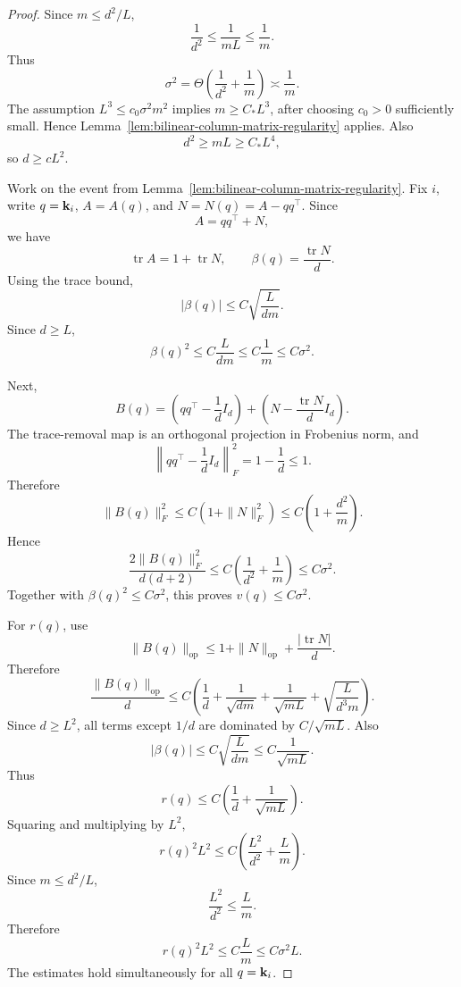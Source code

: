 \begin{proof}
Since \(m\le d^2/L\),
\[
\frac1{d^2}\le \frac1{mL}\le \frac1m.
\]
Thus
\[
\sigma^2=\Theta\left(\frac1{d^2}+\frac1m\right)\asymp \frac1m.
\]
The assumption \(L^3\le c_0\sigma^2m^2\) implies \(m\ge C_*L^3\), after choosing
\(c_0>0\) sufficiently small. Hence
Lemma~\ref{lem:bilinear-column-matrix-regularity} applies. Also
\[
d^2\ge mL\ge C_*L^4,
\]
so \(d\ge cL^2\).

Work on the event from Lemma~\ref{lem:bilinear-column-matrix-regularity}. Fix
\(i\), write \(q={\mathbf{k}}_i\), \(A=A(q)\), and \(N=N(q)=A-qq^\top\). Since
\[
A=qq^\top+N,
\]
we have
\[
\operatorname{tr}A=1+\operatorname{tr}N,
\qquad
\beta(q)=\frac{\operatorname{tr}N}{d}.
\]
Using the trace bound,
\[
|\beta(q)|\le C\sqrt{\frac{L}{dm}}.
\]
Since \(d\ge L\),
\[
\beta(q)^2\le C\frac{L}{dm}\le C\frac1m\le C\sigma^2.
\]

Next,
\[
B(q)
=
\left(qq^\top-\frac1dI_d\right)
+
\left(N-\frac{\operatorname{tr}N}{d}I_d\right).
\]
The trace-removal map is an orthogonal projection in Frobenius norm, and
\[
\left\|qq^\top-\frac1dI_d\right\|_F^2
=
1-\frac1d
\le1.
\]
Therefore
\[
\|B(q)\|_F^2
\le
C\left(1+\|N\|_F^2\right)
\le
C\left(1+\frac{d^2}{m}\right).
\]
Hence
\[
\frac{2\|B(q)\|_F^2}{d(d+2)}
\le
C\left(\frac1{d^2}+\frac1m\right)
\le
C\sigma^2.
\]
Together with \(\beta(q)^2\le C\sigma^2\), this proves \(v(q)\le C\sigma^2\).

For \(r(q)\), use
\[
\|B(q)\|_{\mathrm{op}}
\le
1+\|N\|_{\mathrm{op}}+\frac{|\operatorname{tr}N|}{d}.
\]
Therefore
\[
\frac{\|B(q)\|_{\mathrm{op}}}{d}
\le
C\left(
\frac1d+
\frac1{\sqrt{dm}}+
\frac1{\sqrt{mL}}+
\sqrt{\frac{L}{d^3m}}
\right).
\]
Since \(d\ge L^2\), all terms except \(1/d\) are dominated by
\(C/\sqrt{mL}\). Also
\[
|\beta(q)|
\le
C\sqrt{\frac{L}{dm}}
\le
C\frac1{\sqrt{mL}}.
\]
Thus
\[
r(q)
\le
C\left(\frac1d+\frac1{\sqrt{mL}}\right).
\]
Squaring and multiplying by \(L^2\),
\[
r(q)^2L^2
\le
C\left(\frac{L^2}{d^2}+\frac{L}{m}\right).
\]
Since \(m\le d^2/L\),
\[
\frac{L^2}{d^2}\le \frac{L}{m}.
\]
Therefore
\[
r(q)^2L^2\le C\frac{L}{m}\le C\sigma^2L.
\]
The estimates hold simultaneously for all \(q={\mathbf{k}}_i\).
\end{proof}
